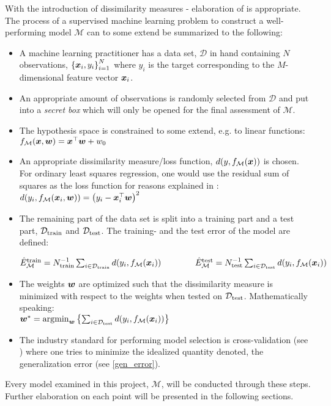 With the introduction of dissimilarity measures - elaboration of  is appropriate. The process of a supervised machine learning problem to construct a well-performing model $\mathcal{M}$ can to some extend be summarized to the following: 
\begin{itemize}
    \item A machine learning practitioner has a data set, $\mathcal{D}$ in hand containing $N$ observations, $\left\{ \bm{x}_i, y_i \right\}_{i=1}^{N}$ where $y_i$ is the target corresponding to the $M$-dimensional feature vector $\bm{x}_i$.
    \item An appropriate amount of observations is randomly selected from $\mathcal{D}$ and put into a \emph{secret box} which will only be opened for the final assessment of $\mathcal{M}$.
    \item The hypothesis space is constrained to some extend, e.g. to linear functions:\\ $f_{\mathcal{M}}(\bm{x},\boldsymbol{w}) = \bm{x}^{\top} \boldsymbol{w} + w_0$
    \item An appropriate dissimilarity measure/loss function, $d\qty(y,f_{\mathcal{M}}\qty(\bm{x}))$ is chosen. For ordinary least squares regression, one would use the residual sum of squares as the loss function for reasons explained in :\\
    $d(y_i,f_{\mathcal{M}}\qty(\bm{x}_i,\boldsymbol{w})) = \qty(y_i - \bm{x}_i^{\top}\boldsymbol{w})^2$
    \item The remaining part of the data set is split into a training part and a test part, $\mathcal{D}_{\mathrm{train}}$ and $\mathcal{D}_{\mathrm{test}}$. The training- and the test error of the model are defined:
    \begin{center}$\hat{E}_{\mathcal{M}}^{\mathrm{train}} = N_{\mathrm{train}}^{-1} \sum_{i \in \mathcal{D}_{\mathrm{train}}} d\qty(y_i,f_{\mathcal{M}}\qty(\bm{x}_i)) \qquad \qquad \hat{E}_{\mathcal{M}}^{\mathrm{test}} = N_{\mathrm{test}}^{-1} \sum_{i \in \mathcal{D}_{\mathrm{test}}} d\qty(y_i,f_{\mathcal{M}}\qty(\bm{x}_i))$
    \end{center}
    \item The weights $\boldsymbol{w}$ are optimized such that the dissimilarity measure is minimized with respect to the weights when tested on $\mathcal{D}_{\mathrm{test}}$. Mathematically speaking:\\
    $\boldsymbol{w}^* =\operatorname*{\arg\!\min}_{\boldsymbol{w}}\left\{\sum_{i \in \mathcal{D}_{\mathrm{test}}} d\qty(y_i,f_{\mathcal{M}}\qty(\bm{x}_i))\right\}$
    \item The industry standard for performing model selection is cross-validation (see ) where one tries to minimize the idealized quantity denoted, the generalization error (see \eqref{gen_error}).
\end{itemize}
Every model examined in this project, $\mathcal{M}$, will be conducted through these steps. Further elaboration on each point will be presented in the following sections.

